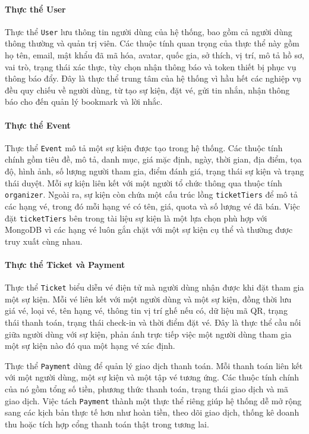\documentclass[../DoAn.tex]{subfiles}
\begin{document}
\paragraph{Thực thể User}\mbox{}

Thực thể \texttt{User} lưu thông tin người dùng của hệ thống, bao gồm cả người dùng thông thường và quản trị viên. Các thuộc tính quan trọng của thực thể này gồm họ tên, email, mật khẩu đã mã hóa, avatar, quốc gia, sở thích, vị trí, mô tả hồ sơ, vai trò, trạng thái xác thực, tùy chọn nhận thông báo và token thiết bị phục vụ thông báo đẩy. Đây là thực thể trung tâm của hệ thống vì hầu hết các nghiệp vụ đều quy chiếu về người dùng, từ tạo sự kiện, đặt vé, gửi tin nhắn, nhận thông báo cho đến quản lý bookmark và lời nhắc.

\paragraph{Thực thể Event}\mbox{}

Thực thể \texttt{Event} mô tả một sự kiện được tạo trong hệ thống. Các thuộc tính chính gồm tiêu đề, mô tả, danh mục, giá mặc định, ngày, thời gian, địa điểm, tọa độ, hình ảnh, số lượng người tham gia, điểm đánh giá, trạng thái sự kiện và trạng thái duyệt. Mỗi sự kiện liên kết với một người tổ chức thông qua thuộc tính \texttt{organizer}. Ngoài ra, sự kiện còn chứa một cấu trúc lồng \texttt{ticketTiers} để mô tả các hạng vé, trong đó mỗi hạng vé có tên, giá, quota và số lượng vé đã bán. Việc đặt \texttt{ticketTiers} bên trong tài liệu sự kiện là một lựa chọn phù hợp với MongoDB vì các hạng vé luôn gắn chặt với một sự kiện cụ thể và thường được truy xuất cùng nhau.

\paragraph{Thực thể Ticket và Payment}\mbox{}

Thực thể \texttt{Ticket} biểu diễn vé điện tử mà người dùng nhận được khi đặt tham gia một sự kiện. Mỗi vé liên kết với một người dùng và một sự kiện, đồng thời lưu giá vé, loại vé, tên hạng vé, thông tin vị trí ghế nếu có, dữ liệu mã \gls{QR}, trạng thái thanh toán, trạng thái check-in và thời điểm đặt vé. Đây là thực thể cầu nối giữa người dùng với sự kiện, phản ánh trực tiếp việc một người dùng tham gia một sự kiện nào đó qua một hạng vé xác định.

Thực thể \texttt{Payment} dùng để quản lý giao dịch thanh toán. Mỗi thanh toán liên kết với một người dùng, một sự kiện và một tập vé tương ứng. Các thuộc tính chính của nó gồm tổng số tiền, phương thức thanh toán, trạng thái giao dịch và mã giao dịch. Việc tách \texttt{Payment} thành một thực thể riêng giúp hệ thống dễ mở rộng sang các kịch bản thực tế hơn như hoàn tiền, theo dõi giao dịch, thống kê doanh thu hoặc tích hợp cổng thanh toán thật trong tương lai.
\end{document}
